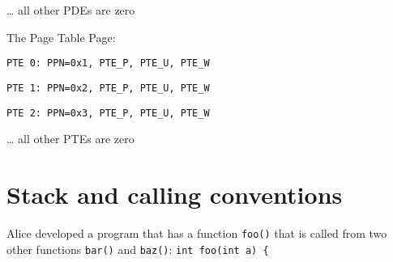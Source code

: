\documentclass[]{article}
\begin{document}
\ldots{} all other PDEs are zero

The Page Table Page:

\texttt{PTE\ 0:\ PPN=0x1,\ PTE\_P,\ PTE\_U,\ PTE\_W}

\texttt{PTE\ 1:\ PPN=0x2,\ PTE\_P,\ PTE\_U,\ PTE\_W}

\texttt{PTE\ 2:\ PPN=0x3,\ PTE\_P,\ PTE\_U,\ PTE\_W}

\ldots{} all other PTEs are zero

\hypertarget{stack-and-calling-conventions}{%
\section{Stack and calling
conventions}\label{stack-and-calling-conventions}}

Alice developed a program that has a function \texttt{foo()} that is
called from two other functions \texttt{bar()} and \texttt{baz()}:
\texttt{int\ foo(int\ a)\ \{}
\end{document}
